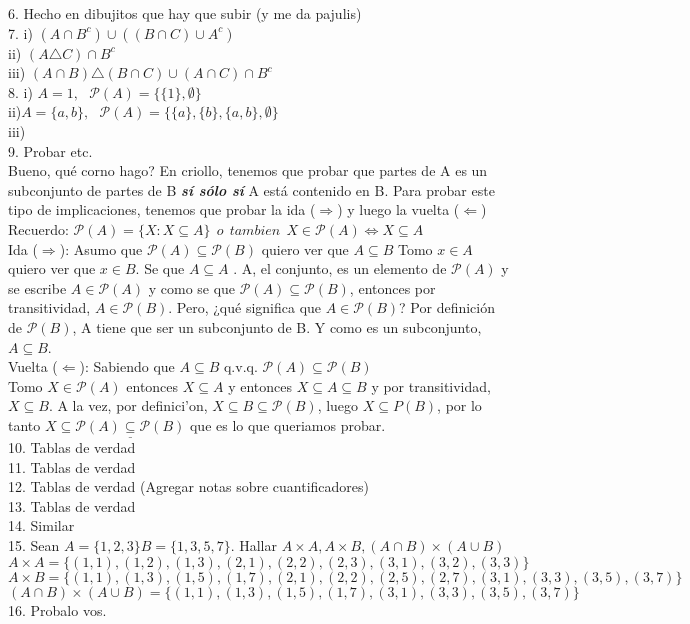 \documentclass[a4paper,11pt]{article}
\begin{document}
6. Hecho en dibujitos que hay que subir (y me da pajulis)\\
7. i) \((A\cap B^{c})\cup((B\cap C) \cup A^{c})\)\\
ii) \((A\triangle C)\cap B^{c}\)\\
iii) \((A\cap B)\triangle(B\cap C)\cup(A\cap C)\cap B^{c}\)\\
8. i) \(A={1},\:\:\:\mathcal{P}(A)=\{\{1\},\emptyset\}\)\\
ii)\(A=\{a,b\},\:\:\:\mathcal{P}(A)=\{\{a\},\{b\},\{a,b\},\emptyset\}\)\\
iii)\\
9. Probar etc. \\
Bueno, qué corno hago? En criollo, tenemos que probar que partes de A es un subconjunto de partes de B \textbf{\textit{sí sólo sí}} A está contenido en B. Para probar este tipo de implicaciones, tenemos que probar la ida (\(\Rightarrow\)) y luego la vuelta (\(\Leftarrow\))\\
Recuerdo: \(\mathcal{P}(A)=\{X:X\subseteq A\}\:\: o\:\:tambien\:\: X \in \mathcal{P}(A)\iff X\subseteq A\)\\
Ida (\(\Rightarrow\)): Asumo que \(\mathcal{P}(A)\subseteq \mathcal{P}(B)\) quiero ver que \(A\subseteq B \)
Tomo \(x \in A \) quiero ver que \(x \in B \). Se que \(A \subseteq A\) . A, el conjunto, es un elemento de \(\mathcal{P}(A)\) y se escribe \(A\in \mathcal{P}(A)\) y como se que \(\mathcal{P}(A)\subseteq \mathcal{P}(B)\), entonces por transitividad,  \(A\in \mathcal{P}(B)\). Pero, ¿qué significa que \(A\in \mathcal{P}(B)\)? Por definición de \(\mathcal{P}(B)\), A tiene que ser un subconjunto de B. Y como es un subconjunto,  \(A\subseteq B \).\\
Vuelta (\(\Leftarrow\)): Sabiendo que \(A\subseteq B \) q.v.q. \(\mathcal{P}(A)\subseteq \mathcal{P}(B)\) \\
Tomo \(X \in \mathcal{P}(A) \) entonces \(X \subseteq A \) y entonces \(X \subseteq A \subseteq B\) y por transitividad, \(X \subseteq B\). A la vez, por definici'on, \(X \subseteq B \subseteq \mathcal{P}(B) \), luego \(X \subseteq {P}(B) \), por lo tanto \(X \subseteq \underline{\mathcal{P}(A) \subseteq \mathcal{P}(B)} \) que es lo que queriamos probar.\\
10. Tablas de verdad\\
11. Tablas de verdad \\
12. Tablas de verdad (Agregar notas sobre cuantificadores) \\
13. Tablas de verdad \\
14. Similar \\
15. Sean \(A=\{1,2,3\} B=\{1,3,5,7\}\). Hallar \(A\times A, A\times B, (A\cap B)\times(A\cup B)\)\\
\(A \times A= \{(1,1),(1,2),(1,3),(2,1),(2,2),(2,3),(3,1),(3,2),(3,3)\} \)\\
\(A \times B= \{(1,1),(1,3),(1,5),(1,7),(2,1),(2,2),(2,5),(2,7),(3,1),(3,3),(3,5),(3,7)\} \)\\
\((A\cap B)\times(A\cup B)=\{(1,1),(1,3),(1,5),(1,7),(3,1),(3,3),(3,5),(3,7)\} \)\\
16. Probalo vos. \\
\end{document}
